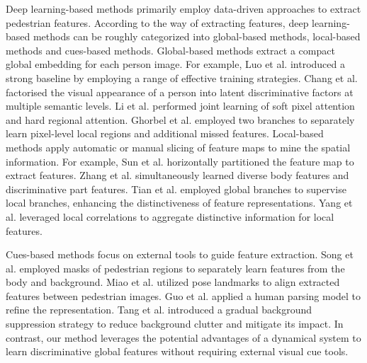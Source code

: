 \documentclass[12pt]{spieman}  %
\begin{document}
\begin{spacing}{2}
Deep learning-based methods primarily employ data-driven approaches to extract pedestrian features. According to the way of extracting features, deep learning-based methods can be roughly categorized into global-based methods, local-based methods and cues-based methods. Global-based methods extract a compact global embedding for each person image. For example, Luo et al. \cite{luo2019bag} introduced a strong baseline by employing a range of effective training strategies. Chang et al. \cite{chang2018multi}  factorised the visual appearance of a person into latent discriminative factors at multiple semantic levels. Li et al. \cite{li2018harmonious} performed joint learning of soft pixel attention and hard regional attention. Ghorbel et al. \cite{ghorbel2022masking} employed two branches to separately learn pixel-level local regions and additional missed features. Local-based methods apply automatic or manual slicing of feature maps to mine the spatial information. For example, Sun et al. \cite{sun2018beyond} horizontally partitioned the feature map to extract features. Zhang et al. \cite{zhang2021appearance} simultaneously learned diverse body features and discriminative part features. Tian et al. \cite{tian2023self} employed global branches to supervise local branches, enhancing the distinctiveness of feature representations. Yang et al. \cite{yan2023part} leveraged local correlations to aggregate distinctive information for local features.

Cues-based methods focus on external tools to guide feature extraction. Song et al. \cite{song2018mask} employed masks of pedestrian regions to separately learn features from the body and background. Miao et al. \cite{miao2019pose} utilized pose landmarks to align extracted features between pedestrian images. Guo et al. \cite{guo2019beyond} applied a human parsing model to refine the representation. Tang et al. \cite{tang2020person} introduced a gradual background suppression strategy to reduce background clutter and mitigate its impact. In contrast, our method leverages the potential advantages of a dynamical system to learn discriminative global features without requiring external visual cue tools.


\end{spacing}
\end{document}
